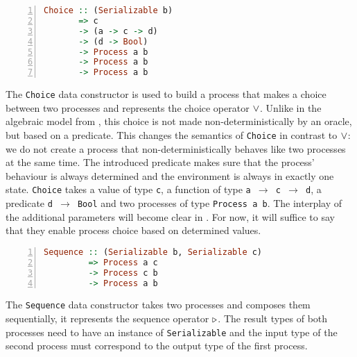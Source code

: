 \begin{lstlisting}[language=Haskell,caption=Signature of the \texttt{Choice} type constructor.,numbers=left,frame=bt]
Choice :: (Serializable b)
       => c
       -> (a -> c -> d)
       -> (d -> Bool)
       -> Process a b
       -> Process a b
       -> Process a b
\end{lstlisting}
The \texttt{Choice} data constructor is used to build a process that makes a choice between two processes and represents the choice operator $\vee$. Unlike in the algebraic model from , this choice is not made non-deterministically by an oracle, but based on a predicate. This changes the semantics of \texttt{Choice} in contrast to $\vee$: we do not create a process that non-deterministically behaves like two processes at the same time. The introduced predicate makes sure that the process' behaviour is always determined and the environment is always in exactly one state. \texttt{Choice} takes a value of type \texttt{c}, a function of type \texttt{a $\to$ c $\to$ d}, a predicate \texttt{d $\to$ Bool} and two processes of type \texttt{Process a b}. The interplay of the additional parameters will become clear in . For now, it will suffice to say that they enable process choice based on determined values.

\begin{lstlisting}[language=Haskell,caption=Signature of the \texttt{Seqeuence} type constructor.,numbers=left,frame=bt]
Sequence :: (Serializable b, Serializable c)
         => Process a c
         -> Process c b
         -> Process a b
\end{lstlisting}
The \texttt{Sequence} data constructor takes two processes and composes them sequentially, it represents the sequence operator $\triangleright$. The result types of both processes need to have an instance of \texttt{Serializable} and the input type of the second process must correspond to the output type of the first process.

